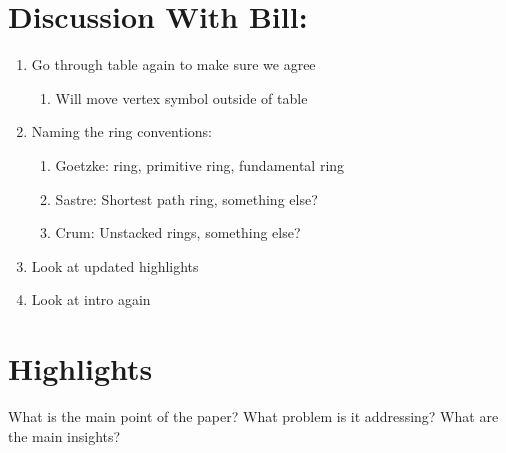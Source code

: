 \documentclass[11pt]{article}
\begin{document}
\section{Discussion With Bill:}
\label{sec:org9624c98}
\begin{enumerate}
\item Go through table again to make sure we agree
\begin{enumerate}
\item Will move vertex symbol outside of table
\end{enumerate}
\item Naming the ring conventions:
\begin{enumerate}
\item Goetzke: ring, primitive ring, fundamental ring \cite{marians-network-1990,guttman-ring-1990,goetzke-properties-1991}
\item Sastre: Shortest path ring, something else?
\item Crum: Unstacked rings, something else?
\end{enumerate}
\item Look at updated highlights
\item Look at intro again
\end{enumerate}

\section{Highlights}
\label{sec:orgcb8af34}
What is the main point of the paper? What problem is it addressing? What are the main insights?
\end{document}
